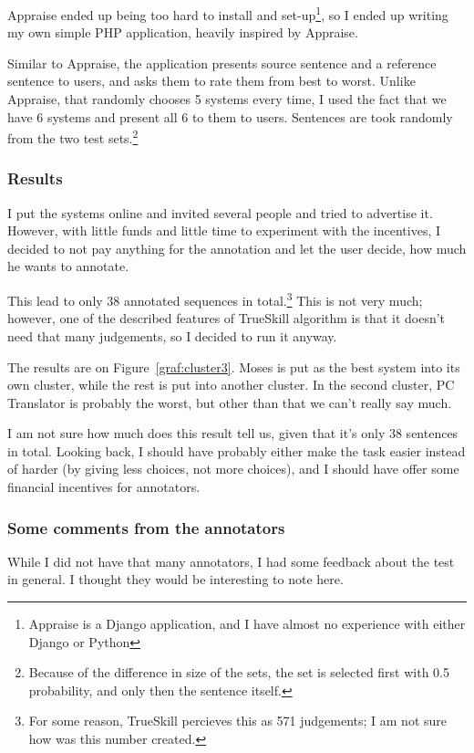Appraise ended up being too hard to install and set-up\footnote{Appraise is a Django application, and I have almost no experience with either Django or Python}, so I ended up writing my own simple PHP application, heavily inspired by Appraise. 

Similar to Appraise, the application presents source sentence and a reference sentence to users, and
asks them to rate them from best to worst.
Unlike Appraise, that randomly chooses 5 systems every time, I used the fact that we have 6 systems and present all 6 to them to users. Sentences are took randomly from the two test sets.\footnote{Because of the difference in size of the sets, the set is selected first with 0.5 probability, and only then the sentence itself.}


\subsubsection{Results}

I put the systems online and invited several people and tried to advertise it. However, with little funds and little time to experiment with the incentives, I decided to not pay anything for the annotation and let the user decide, how much he wants to annotate.

This lead to only 38 annotated sequences in total.\footnote{For some reason, TrueSkill percieves this as 571 judgements; I am not sure how was this number created.} This is not very much; however, one of the described features of TrueSkill algorithm is that it doesn't need that many judgements, so I decided to run it anyway.

The results are on Figure~\ref{graf:cluster3}. Moses is put as the best system into its own cluster, while the rest is put into another cluster. In the second cluster, PC Translator is probably the worst, but other than that we can't really say much.

I am not sure how much does this result tell us, given that it's only 38 sentences in total. Looking back, I should have probably either make the task easier instead of harder (by giving less choices, not more choices), and I should have offer some financial incentives for annotators.
\subsubsection{Some comments from the annotators}
While I did not have that many annotators, I had some feedback about the test in general. I thought they would be interesting to note here.

